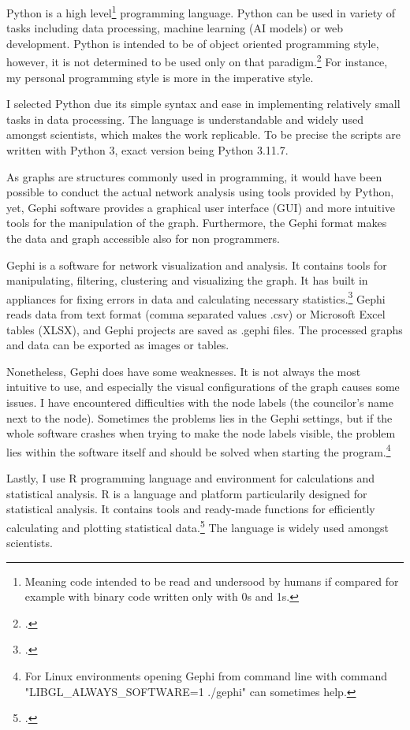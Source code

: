 Python is a high level\footnote{Meaning code intended to be read and undersood by humans if compared for example with binary code written only with 0s and 1s.} programming language. Python can be used in variety of tasks including data processing, machine learning (AI models) or web development. Python is intended to be of object oriented programming style, however, it is not determined to be used only on that paradigm.\footcite[p. 1.]{pythonbook} For instance, my personal programming style is more in the imperative style. 

I selected Python due its simple syntax and ease in implementing relatively small tasks in data processing. The language is understandable and widely used amongst scientists, which makes the work replicable. To be precise the scripts are written with Python 3, exact version being Python 3.11.7.

As graphs are structures commonly used in programming, it would have been possible to conduct the actual network analysis using tools provided by Python, yet, Gephi software provides a graphical user interface (GUI) and more intuitive tools for the manipulation of the graph. Furthermore, the Gephi format makes the data and graph accessible also for non programmers.

Gephi is a software for network visualization and analysis. It contains tools for manipulating, filtering, clustering and visualizing the graph. It has built in appliances for fixing errors in data and calculating necessary statistics.\footcite{gephi} Gephi reads data from text format (comma separated values .csv) or Microsoft Excel tables (XLSX), and Gephi projects are saved as .gephi files. The processed graphs and data can be exported as images or tables.  

Nonetheless, Gephi does have some weaknesses. It is not always the most intuitive to use, and especially the visual configurations of the graph causes some issues. I have encountered difficulties with the node labels (the councilor's name next to the node). Sometimes the problems lies in the Gephi settings, but if the whole software crashes when trying to make the node labels visible, the problem lies within the software itself and should be solved when starting the program.\footnote{For Linux environments opening Gephi from command line with command "LIBGL\_ALWAYS\_SOFTWARE=1 ./gephi" can sometimes help.} 

Lastly, I use R programming language and environment for calculations and statistical analysis. R is a language and platform particularily designed for statistical analysis. It contains tools and ready-made functions for efficiently calculating and plotting statistical data.\footcite{R} The language is widely used amongst scientists. 


